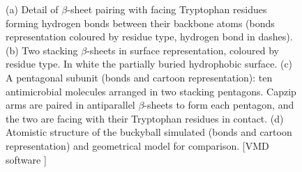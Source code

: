 \begin{figure}[p!]
\centering
{}
\hspace{0.05\linewidth}
\caption[Building blocks of capzip assembly]{(a) Detail of $\beta$-sheet pairing with facing Tryptophan residues forming hydrogen bonds between their backbone atoms (bonds representation coloured by residue type, hydrogen bond in dashes). (b) Two stacking $\beta$-sheets in surface representation, coloured by residue type. In white the partially buried hydrophobic surface. (c) A pentagonal subunit (bonds and cartoon representation): ten antimicrobial molecules arranged in two stacking pentagons. Capzip arms are paired in antiparallel $\beta$-sheets to form each pentagon, and the two are facing with their Tryptophan residues in contact. (d) Atomistic structure of the buckyball simulated (bonds and cartoon representation) and geometrical model for comparison. [VMD software \citet{HUMP96}]}
\label{fig:BTI_vmd}
\end{figure}
